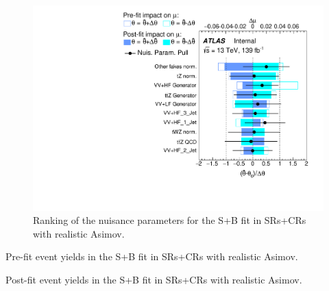 \begin{figure}[htbp]
	\centering
	\includegraphics[width=.9\textwidth]{Appendices/AP8/figures/SPLUSB_CRSR_UsingSMTFullSys/Ranking}
	\caption{Ranking of the nuisance parameters for the S+B \tZc fit in SRs+CRs with realistic Asimov.}%
	\label{fig:stat_smt:tzc:splusb:crsr:ranking}
\end{figure}

\FloatBarrier
\clearpage
\begin{table}[]
	\centering
	\tiny
	
	\caption{Pre-fit event yields in the S+B \tZc fit in SRs+CRs with realistic Asimov. \TabErrStatSys} 
	\label{tab:stat_smt:tzc:splusb:crsr:yields:prefit}
\end{table} 

\begin{table}[]
	\centering
	\tiny
	
	\caption{Post-fit event yields in the S+B \tZc fit in SRs+CRs with realistic Asimov. \TabErrStatSys} 
	\label{tab:stat_smt:tzc:splusb:crsr:yields:postfit}
\end{table} 
\clearpage
\FloatBarrier

